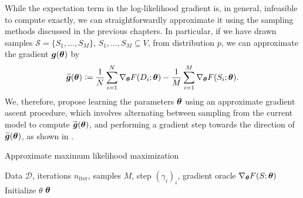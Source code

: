 While the expectation term in the log-likelihood gradient is, in general, infeasible to compute exactly, we can straightforwardly approximate it using the sampling methods discussed in the previous chapters.
In particular, if we have drawn samples $\mathcal{S} = \{ S_1,\ldots,S_M \}$, $S_1,\ldots,S_M \subseteq V$, from distribution $p$, we can approximate the gradient $\bm{g}(\bm{\theta})$ by
\begin{align*}
\widetilde{\bm{g}}(\bm{\theta}) \vcentcolon= \frac{1}{N}\sum_{i=1}^N \nabla_{\bm{\theta}} F(D_i; \bm{\theta}) - \frac{1}{M}\sum_{i=1}^M \nabla_{\bm{\theta}} F(S_i; \bm{\theta}).
\end{align*}
We, therefore, propose learning the parameters $\bm{\theta}$ using an approximate gradient ascent procedure, which involves alternating between sampling from the current model to compute $\widetilde{\bm{g}}(\bm{\theta})$, and performing a gradient step towards the direction of $\widetilde{\bm{g}}(\bm{\theta})$, as shown in .

\begin{algorithm}[tb]
  \caption{Approximate maximum likelihood maximization}
  \label{alg:grad}
    \begin{algorithmic}[1]
      \REQUIRE Data $\mathcal{D}$, iterations $n_{\mathrm{iter}}$, samples $M$, step $(\gamma_i)_i$, gradient oracle $\nabla_{\bm{\theta}} F(S; \bm{\theta})$
      \STATE Initialize $\theta$
      \ENDFOR
      \RETURN $\bm{\theta}$
    \end{algorithmic}
\end{algorithm}

